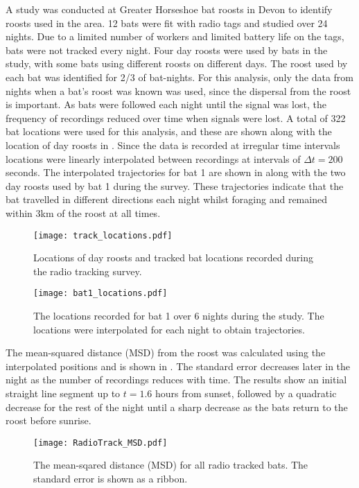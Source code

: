 A study was conducted at Greater Horseshoe bat roosts in Devon to identify roosts used in the area. 12 bats were fit with radio tags and studied over 24 nights. Due to a limited number of workers and limited battery life on the tags, bats were not tracked every night. Four day roosts were used by bats in the study, with some bats using different roosts on different days. The roost used by each bat was identified for 2/3 of bat-nights. For this analysis, only  the data from nights when a bat's roost was known was used, since the dispersal from the roost is important. As bats were followed each night until the signal was lost, the frequency of recordings reduced over time when signals were lost. A total of 322 bat locations were used for this analysis, and these are shown along with the location of day roosts in . Since the data is recorded at irregular time intervals locations were linearly interpolated between recordings at intervals of $\Delta t = 200$ seconds. The interpolated trajectories for bat 1 are shown in  along with the two day roosts used by bat 1 during the survey. These trajectories indicate that the bat travelled in different directions each night whilst foraging and remained within 3km of the roost at all times.
\begin{figure} [h]
    \centering
        \texttt{[image: track\_locations.pdf]}
        \caption{Locations of day roosts and tracked bat locations recorded during the radio tracking survey.}
    \label{fig:radiotrack_locations}
\end{figure}
%
\begin{figure} [h]
    \centering
        \texttt{[image: bat1\_locations.pdf]}
        \caption{The locations recorded for bat 1 over 6 nights during the study. The locations were interpolated for each night to obtain trajectories.}
    \label{fig:bat1}
\end{figure}
%
The mean-squared distance (MSD) from the roost was calculated using the interpolated positions and is shown in . The standard error decreases later in the night as the number of recordings reduces with time. The results show an initial straight line segment up to $t = 1.6$ hours from sunset, followed by a quadratic decrease for the rest of the night until a sharp decrease as the bats return to the roost before sunrise.
%
\begin{figure} [h]
    \centering
        \texttt{[image: RadioTrack\_MSD.pdf]}
        \caption{The mean-sqared distance (MSD) for all radio tracked bats. The standard error is shown as a ribbon.}
    \label{fig:MSD}
\end{figure}
%

